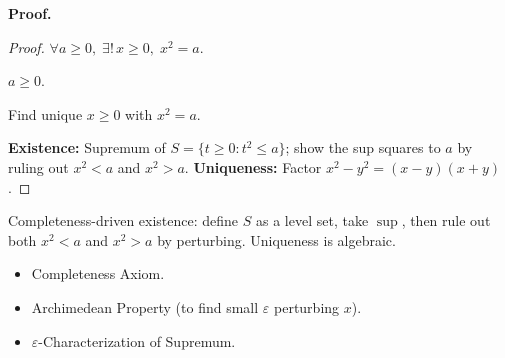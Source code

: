 \noindent
\textbf{Proof.}
\begin{proof}
\Claim $\forall a \ge 0,\; \exists!\, x \ge 0,\; x^2 = a$.

\Given $a \ge 0$.

\Goal Find unique $x \ge 0$ with $x^2 = a$.

\Strategy \textbf{Existence:} Supremum of $S = \{t \ge 0 : t^2 \le a\}$;
show the sup squares to $a$ by ruling out $x^2 < a$ and $x^2 > a$.
\textbf{Uniqueness:} Factor $x^2 - y^2 = (x-y)(x+y)$.

\medskip






\medskip


\end{proof}

\begin{remark*}
Completeness-driven existence: define $S$ as a level set, take $\sup$,
then rule out both $x^2 < a$ and $x^2 > a$ by perturbing.
Uniqueness is algebraic.
\end{remark*}

\begin{remark*}[Dependencies]
\begin{itemize}
  \item Completeness Axiom.
  \item Archimedean Property (to find small $\varepsilon$ perturbing $x$).
  \item $\varepsilon$-Characterization of Supremum.
\end{itemize}
\end{remark*}
